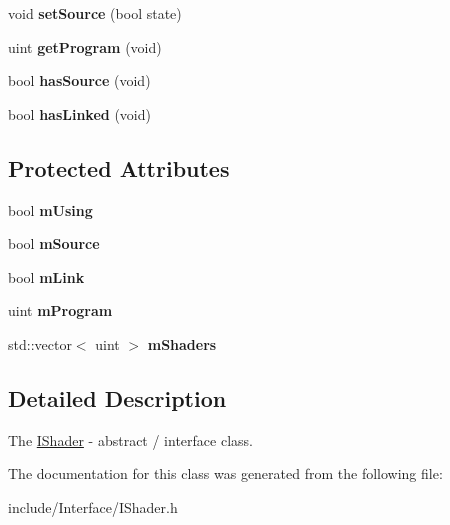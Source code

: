 \begin{DoxyCompactItemize}
\item 
\hypertarget{classEngine_1_1IShader_ab736c917289026225631c7c8bcc2b48b}{}void {\bfseries set\+Source} (bool state)\label{classEngine_1_1IShader_ab736c917289026225631c7c8bcc2b48b}

\item 
\hypertarget{classEngine_1_1IShader_afc547c25eed06f96e5a23be6bc3936bd}{}uint {\bfseries get\+Program} (void)\label{classEngine_1_1IShader_afc547c25eed06f96e5a23be6bc3936bd}

\item 
\hypertarget{classEngine_1_1IShader_a9bdb56da0500f9fd59992a2387c42a0f}{}bool {\bfseries has\+Source} (void)\label{classEngine_1_1IShader_a9bdb56da0500f9fd59992a2387c42a0f}

\item 
\hypertarget{classEngine_1_1IShader_a1ecc3647c399159ea439e7773c791a6a}{}bool {\bfseries has\+Linked} (void)\label{classEngine_1_1IShader_a1ecc3647c399159ea439e7773c791a6a}

\end{DoxyCompactItemize}
\subsection*{Protected Attributes}
\begin{DoxyCompactItemize}
\item 
\hypertarget{classEngine_1_1IShader_a14e21db4751c0d77b6bac90e33037c59}{}bool {\bfseries m\+Using}\label{classEngine_1_1IShader_a14e21db4751c0d77b6bac90e33037c59}

\item 
\hypertarget{classEngine_1_1IShader_a26ff459a120edb2590d36d5c1863a477}{}bool {\bfseries m\+Source}\label{classEngine_1_1IShader_a26ff459a120edb2590d36d5c1863a477}

\item 
\hypertarget{classEngine_1_1IShader_a71e21b1cd50b4b2f4c3db0f42fd84d60}{}bool {\bfseries m\+Link}\label{classEngine_1_1IShader_a71e21b1cd50b4b2f4c3db0f42fd84d60}

\item 
\hypertarget{classEngine_1_1IShader_a4978a68473ec11b0b959504bfb9149d7}{}uint {\bfseries m\+Program}\label{classEngine_1_1IShader_a4978a68473ec11b0b959504bfb9149d7}

\item 
\hypertarget{classEngine_1_1IShader_a89861339c0a3a57bff92b2e33432d448}{}std\+::vector$<$ uint $>$ {\bfseries m\+Shaders}\label{classEngine_1_1IShader_a89861339c0a3a57bff92b2e33432d448}

\end{DoxyCompactItemize}


\subsection{Detailed Description}
The \hyperlink{classEngine_1_1IShader}{I\+Shader} -\/ abstract / interface class. 

The documentation for this class was generated from the following file\+:\begin{DoxyCompactItemize}
\item 
include/\+Interface/I\+Shader.\+h\end{DoxyCompactItemize}
